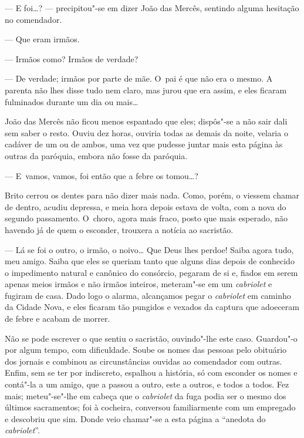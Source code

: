 \begin{linenumbers}
--- E foi\ldots{}? --- precipitou"-se em dizer João das Mercês, sentindo alguma
hesitação no comendador.

--- Que eram irmãos.

--- Irmãos como? Irmãos de verdade?

--- De verdade; irmãos por parte de mãe. O~pai é que não era o mesmo. A
parenta não lhes disse tudo nem claro, mas jurou que era assim, e eles
ficaram fulminados durante um dia ou mais\ldots{}

João das Mercês não ficou menos espantado que eles; dispôs"-se a não sair
dali sem saber o resto. Ouviu dez horas, ouviria todas as demais da
noite, velaria o cadáver de um ou de ambos, uma vez que pudesse juntar
mais esta página às outras da paróquia, embora não fosse da paróquia.

--- E~vamos, vamos, foi então que a febre os tomou\ldots{}?

Brito cerrou os dentes para não dizer mais nada. Como, porém, o viessem
chamar de dentro, acudiu depressa, e meia hora depois estava de volta,
com a nova do segundo passamento. O~choro, agora mais fraco, posto que
mais esperado, não havendo já de quem o esconder, trouxera a notícia ao
sacristão.

--- Lá se foi o outro, o irmão, o noivo\ldots{} Que Deus lhes perdoe! Saiba
agora tudo, meu amigo. Saiba que eles se queriam tanto que alguns dias
depois de conhecido o impedimento natural e canônico do consórcio,
pegaram de si e, fiados em serem apenas meios irmãos e não irmãos
inteiros, meteram"-se em um \emph{cabriolet} e fugiram de casa. Dado logo
o alarma, alcançamos pegar o \emph{cabriolet} em caminho da Cidade Nova,
e eles ficaram tão pungidos e vexados da captura que adoeceram de febre
e acabam de morrer.

Não se pode escrever o que sentiu o sacristão, ouvindo"-lhe este caso.
Guardou"-o por algum tempo, com dificuldade. Soube os nomes das pessoas
pelo obituário dos jornais e combinou as circunstâncias ouvidas ao
comendador com outras. Enfim, sem se ter por indiscreto, espalhou a
história, só com esconder os nomes e contá"-la a um amigo, que a passou a
outro, este a outros, e todos a todos. Fez mais; meteu"-se"-lhe em cabeça
que o \emph{cabriolet} da fuga podia ser o mesmo dos últimos
sacramentos; foi à cocheira, conversou familiarmente com um empregado e
descobriu que sim. Donde veio chamar"-se a esta página a ``anedota do
\emph{cabriolet}''.

\end{linenumbers}
